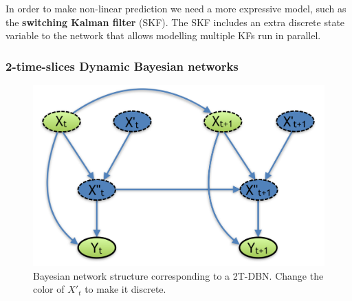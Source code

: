 In order to make non-linear prediction we need a more expressive model, such as the \textbf{switching Kalman filter} (SKF). The SKF includes an extra discrete state variable to the network that allows modelling multiple KFs run in parallel. 

\subsubsection{2-time-slices Dynamic Bayesian networks}	

%
%
%
%
\begin{figure}
\begin{center}
\includegraphics[scale=0.45]{./figures/PreliminariesDBN}
\caption{\label{Figure:DBN}Bayesian network structure corresponding to a 2T-DBN. {\color{red} Change the color of $X'_t$ to make it discrete.}}
\end{center}
\end{figure}

